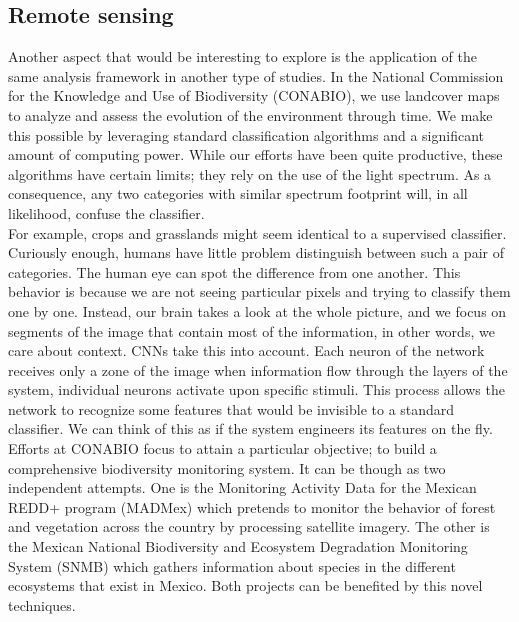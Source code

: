 \subsection{Remote sensing}


Another aspect that would be interesting to explore is the application of the same analysis framework in another type of studies. In the National Commission for the Knowledge and Use of Biodiversity (CONABIO), we use landcover maps to analyze and assess the evolution of the environment through time. We make this possible by leveraging standard classification algorithms and a significant amount of computing power. While our efforts have been quite productive, these algorithms have certain limits; they rely on the use of the light spectrum. As a consequence, any two categories with similar spectrum footprint will, in all likelihood, confuse the classifier.\\

For example, crops and grasslands might seem identical to a supervised classifier. Curiously enough, humans have little problem distinguish between such a pair of categories. The human eye can spot the difference from one another. This behavior is because we are not seeing particular pixels and trying to classify them one by one. Instead, our brain takes a look at the whole picture, and we focus on segments of the image that contain most of the information, in other words, we care about context. CNNs take this into account. Each neuron of the network receives only a zone of the image when information flow through the layers of the system, individual neurons activate upon specific stimuli. This process allows the network to recognize some features that would be invisible to a standard classifier. We can think of this as if the system engineers its features on the fly.\\

Efforts at CONABIO focus to attain a particular objective; to build a comprehensive biodiversity monitoring system. It can be though as two independent attempts. One is the Monitoring Activity Data for the Mexican REDD+ program (MADMex) \cite{rs6053923} which pretends to monitor the behavior of forest and vegetation across the country by processing satellite imagery. The other is the Mexican National Biodiversity and Ecosystem Degradation Monitoring System (SNMB) \cite{GARCIAALANIZ201762} which gathers information about species in the different ecosystems that exist in Mexico. Both projects can be benefited by this novel techniques.\\

